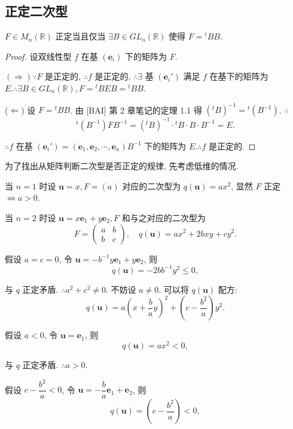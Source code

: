 \documentclass[color=black,device=normal,lang=cn,mode=geye]{elegantnote}
\begin{document}
\subsection{正定二次型}
\begin{theorem}[书上的定理 6]
    $F\in M_n(\mathbb{R})$ 正定当且仅当 $\exists B\in GL _n(\mathbb{R})$ 使得 $F={}^tBB$.
\end{theorem}
\begin{proof}
    设双线性型 $f$ 在基 $(\boldsymbol{e}_i)$ 下的矩阵为 $F$.
    
    $(\Rightarrow)\because F$ 是正定的, $\therefore f$ 是正定的, $\therefore\exists$ 基 $(\boldsymbol{e}_i')$ 满足 $f$ 在基下的矩阵为 $E.\therefore\exists B\in GL _n(\mathbb{R}),F={}^tBEB={}^tBB$.

    ($\Leftarrow$) 设 $F={}^tBB$. 由 [BAI] 第 2 章笔记的定理 1.1 得 $({}^tB)^{-1}={}^t(B^{-1})$. $\therefore$
    \[{}^t(B^{-1})FB^{-1}=({}^tB)^{-1}\cdot{}^tB\cdot B\cdot B^{-1}=E.\]

    $\therefore f$ 在基 $(\boldsymbol{e}_i')=(\boldsymbol{e}_1,\boldsymbol{e}_2,\cdots,\boldsymbol{e}_n)B^{-1}$ 下的矩阵为 $E.\therefore f$ 是正定的.
\end{proof}
为了找出从矩阵判断二次型是否正定的规律, 先考虑低维的情况.

当 $n=1$ 时设 $\boldsymbol{u}=x,F=(a)$ 对应的二次型为 $q(\boldsymbol{u})=ax^2$, 显然 $F$ 正定 $\Leftrightarrow a>0$.

当 $n=2$ 时设 $\boldsymbol{u}=x\boldsymbol{e}_1+y\boldsymbol{e}_2,F$ 和与之对应的二次型为
\[F=\begin{pmatrix}
    a & b \\
    b & c
\end{pmatrix},\quad q(\boldsymbol{u})=ax^2+2bxy+cy^2.\]

假设 $a=c=0$, 令 $\boldsymbol{u}=-b^{-1}y\boldsymbol{e}_1+y\boldsymbol{e}_2$, 则
\[q(\boldsymbol{u})=-2bb^{-1}y^2\leq0,\]

与 $q$ 正定矛盾. $\therefore a^2+c^2\neq0$. 不妨设 $a\neq0$. 可以将 $q(\boldsymbol{u})$ 配方:
\begin{equation}\label{eq3.2}
    q(\boldsymbol{u})=a\left(x+\dfrac{b}{a}y\right)^2+\left(c-\dfrac{b^2}{a}\right)y^2.
\end{equation}

假设 $a<0$, 令 $\boldsymbol{u}=\boldsymbol{e}_1$, 则
\[q(\boldsymbol{u})=ax^2<0,\]

与 $q$ 正定矛盾. $\therefore a>0$.

假设 $c-\dfrac{b^2}{a}<0$, 令 $\boldsymbol{u}=-\dfrac{b}{a}\boldsymbol{e}_1+\boldsymbol{e}_2$, 则
\[q(\boldsymbol{u})=\left(c-\dfrac{b^2}{a}\right)<0,\]
\end{document}
